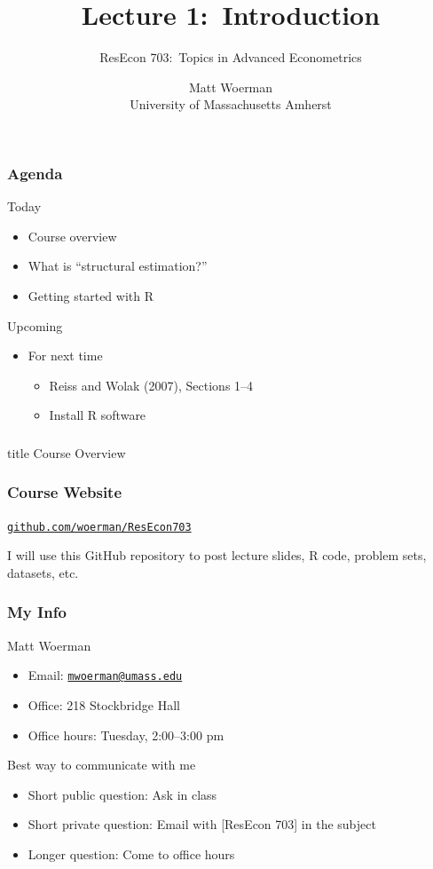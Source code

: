 \documentclass{beamer}
\title[Lecture 1:\ Introduction]{Lecture 1:\ Introduction}
\author[ResEcon 703:\ Advanced Econometrics]{ResEcon 703:\ Topics in Advanced Econometrics}
\date{Matt Woerman\\University of Massachusetts Amherst}
\begin{document}
{ 
\begin{frame}[noframenumbering]
    \titlepage
\end{frame}
}

\begin{frame}\frametitle{Agenda}
    Today
    \begin{itemize}
        \item Course overview
        \item What is ``structural estimation?''
        \item Getting started with R
    \end{itemize}
    \vspace{3ex}
    Upcoming
    \begin{itemize}
        \item For next time
        \begin{itemize}
            \item Reiss and Wolak (2007), Sections 1--4
            \item Install R software
        \end{itemize}
    \end{itemize}
\end{frame}

\begin{frame}\frametitle{}
    \vfill
    \centering
    \begin{beamercolorbox}[center]{title}
        \Large Course Overview
    \end{beamercolorbox}
    \vfill
\end{frame}

\begin{frame}\frametitle{Course Website}
    \begin{center}
        \href{https://github.com/woerman/ResEcon703}{\texttt{github.com/woerman/ResEcon703}}
    \end{center}
    \vspace{3ex}
    I will use this GitHub repository to post lecture slides, R code, problem sets, datasets, etc.
\end{frame}

\begin{frame}\frametitle{My Info}
    Matt Woerman
    \begin{itemize}
        \item Email: \href{mailton:mwoerman@umass.edu}{\texttt{mwoerman@umass.edu}}
        \item Office: 218 Stockbridge Hall
        \item Office hours: Tuesday, 2:00--3:00 pm
    \end{itemize}
    \vspace{3ex}
    Best way to communicate with me
    \begin{itemize}
        \item Short public question: Ask in class
        \item Short private question: Email with [ResEcon 703] in the subject
        \item Longer question: Come to office hours
    \end{itemize}
\end{frame}
\end{document}
